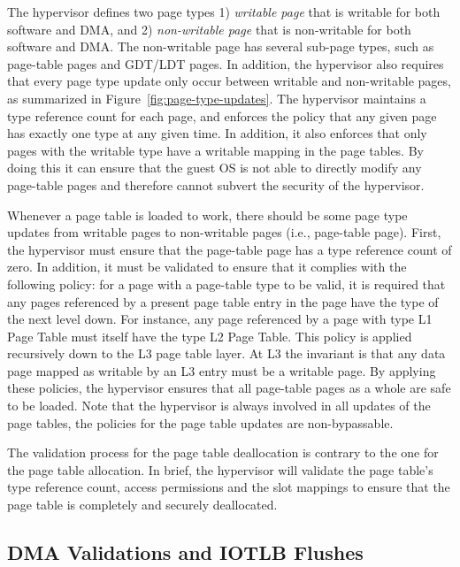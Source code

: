 The hypervisor defines two page types 1) \emph{writable page} that is writable for both software and DMA, and 2) \emph{non-writable page} that is non-writable for both software and DMA.
The non-writable page has several sub-page types, such as page-table pages and GDT/LDT pages.
In addition, the hypervisor also requires that every page type update only occur between writable and non-writable pages, as summarized in Figure~\ref{fig:page-type-updates}.
The hypervisor maintains a type reference count for each page, and enforces the policy that any given page has exactly one type at any given time.
In addition, it also enforces that only pages with the writable type have a writable mapping in the page tables.
By doing this it can ensure that the guest OS is not able to directly modify any page-table pages and therefore cannot subvert the security of the hypervisor.

Whenever a page table is loaded to work, there should be some page type updates from writable pages to non-writable pages (i.e., page-table page).
First, the hypervisor must ensure that the page-table page has a type reference count of zero.
In addition, it must be validated to ensure that it complies with the following policy:
for a page with a page-table type to be valid, it is required that any pages referenced
by a present page table entry in the page have the type of the next level down.
For instance, any page referenced by a page with type L1 Page Table must itself have the type L2 Page Table.
This policy is applied recursively down to the L3 page table layer.
At L3 the invariant is that any data page mapped as writable by an L3 entry must be a writable page.
By applying these policies, the hypervisor ensures that all page-table pages as a whole are safe to be loaded.
Note that the hypervisor is always involved in all updates of the page tables, the policies for the page table updates are non-bypassable.

The validation process for the page table deallocation is contrary to the one for the page table allocation.
In brief, the hypervisor will validate the page table's type reference count, access permissions and the slot mappings to ensure that the page table is completely and securely deallocated.

\subsection{DMA Validations and IOTLB Flushes}
